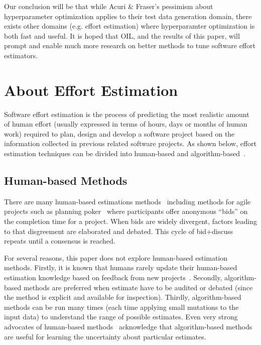 \documentclass[10pt,conference]{IEEEtran}
\begin{document}
Our conclusion will be that  while Acuri \& Fraser's pessimism about hyperparameter optimization  applies to their
test data generation domain, there exists other domains (e.g. effort estimation) where hyperparamter optimization is both fast and useful.
It is hoped that OIL, and the results of  this paper,  will prompt and enable much more research on better methods
to tune software effort estimators.


\section{About Effort Estimation} 
Software effort estimation is the process of predicting the most realistic amount of human effort (usually expressed in terms of hours, days or months of human work) required to plan, design and develop a software project based on the information collected in previous related software projects.
As shown below, effort estimation techniques can be divided   into human-based  and algorithm-based~\cite{teak2012,shepperd2007software}.

\subsection{Human-based Methods}

There  are many human-based estimations methods~\cite{Jorgensen2004} including methods for agile projects such as planning poker~\cite{molokk08} where participants offer anonymous “bids” on the completion time for a project. When bids are widely divergent, factors leading to that disgreement are elaborated and debated. This cycle of bid+discuss repeats until a consensus
is reached.


For several reasons, this paper does not explore human-based  estimation methods.
Firstly,   it is known that humans rarely update their human-based estimation knowledge
based on feedback from new projects~\cite{jorgensen2009impact}.
Secondly, algorithm-based methods are preferred when   estimate have to be audited or debated
(since the  method is explicit and   available for inspection). 
Thirdly, algorithm-based methods can be run many times (each time applying small mutations to the input data)
to understand the range of possible estimates.
Even very strong
advocates of human-based methods~\cite{jorg2015a} acknowledge that algorithm-based methods are useful for learning
the
uncertainty
about particular estimates.
\end{document}
